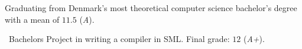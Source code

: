 
Graduating from Denmark's most theoretical computer science bachelor's degree with a mean of $11.5$ (\emph{A}).

\medskip

\faFileO\ Bachelors Project in writing a compiler in SML. Final grade: $12$ (\emph{A+}).


